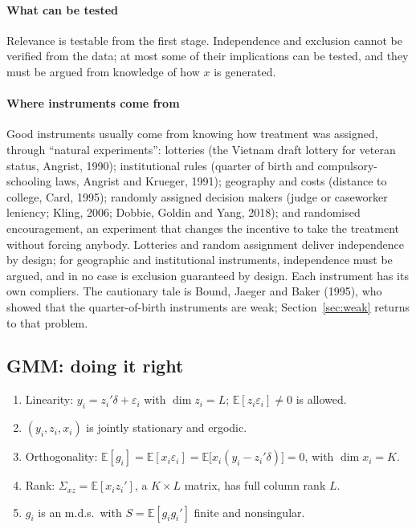 \documentclass[11pt,a4paper]{article}
\newcommand{\E}{\mathbb{E}}
\newcommand{\sxz}{\Sigma_{xz}}
\begin{document}
\paragraph{What can be tested}
Relevance is testable from the first stage. Independence and exclusion cannot be verified from the data; at most some of their implications can be tested, and they must be argued from knowledge of how $x$ is generated.

\paragraph{Where instruments come from}
Good instruments usually come from knowing how treatment was assigned, through ``natural experiments'': lotteries (the Vietnam draft lottery for veteran status, Angrist, 1990); institutional rules (quarter of birth and compulsory-schooling laws, Angrist and Krueger, 1991); geography and costs (distance to college, Card, 1995); randomly assigned decision makers (judge or caseworker leniency; Kling, 2006; Dobbie, Goldin and Yang, 2018); and randomised encouragement, an experiment that changes the incentive to take the treatment without forcing anybody. Lotteries and random assignment deliver independence by design; for geographic and institutional instruments, independence must be argued, and in no case is exclusion guaranteed by design. Each instrument has its own compliers. The cautionary tale is Bound, Jaeger and Baker (1995), who showed that the quarter-of-birth instruments are weak; Section~\ref{sec:weak} returns to that problem.


\subsection{GMM: doing it right}\label{sec:gmm}

\begin{asmset}
\leavevmode
\begin{enumerate}[label=(\roman*)]
\item Linearity: $y_i=z_i'\delta+\varepsilon_i$ with $\dim z_i=L$; $\E[z_i\varepsilon_i]\neq0$ is allowed.
\item $(y_i,z_i,x_i)$ is jointly stationary and ergodic.
\item Orthogonality: $\E[g_i]=\E[x_i\varepsilon_i]=\E\big[x_i(y_i-z_i'\delta)\big]=0$, with $\dim x_i=K$.
\item Rank: $\sxz=\E[x_iz_i']$, a $K\times L$ matrix, has full column rank $L$.
\item $g_i$ is an m.d.s.\ with $S=\E[g_ig_i']$ finite and nonsingular.
\end{enumerate}
\end{asmset}
\end{document}
